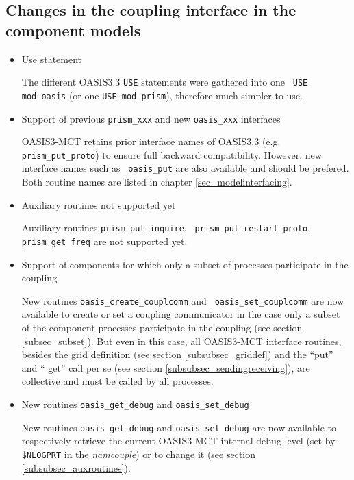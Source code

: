 \subsection{Changes in the coupling interface in the component models}
\label{sec_changes_API}

\begin{itemize}

\item Use statement

The different OASIS3.3 {\tt USE} statements were gathered into one {\tt
  USE mod\_oasis} (or one {\tt USE mod\_prism}), therefore much
  simpler to use.

\item Support of previous {\tt prism\_xxx} and new {\tt oasis\_xxx}
  interfaces

OASIS3-MCT retains prior interface names of OASIS3.3
  (e.g. {\tt prism\_put\_proto}) to ensure full backward
  compatibility. However, new interface names such as {\tt
    oasis\_put} are also available and should be prefered. Both
  routine names are listed in chapter \ref{sec_modelinterfacing}.

\item Auxiliary routines not supported yet

Auxiliary routines {\tt prism\_put\_inquire}, {\tt
  prism\_put\_restart\_proto}, {\tt prism\_get\_freq} are not
  supported yet.

\item Support of components for which only a subset of processes
  participate in the coupling

New routines {\tt oasis\_create\_couplcomm} and {\tt
  oasis\_set\_couplcomm} are now available to create or set a coupling
  communicator in the case only a subset of the component processes
  participate in the coupling (see section \ref{subsec_subset}). But
  even in this case, all OASIS3-MCT interface routines, besides the
  grid definition (see section \ref{subsubsec_griddef}) and the
  ``put'' and `` get'' call per se (see section
  \ref{subsubsec_sendingreceiving}), are collective and must be called
  by all processes.

\item New routines {\tt oasis\_get\_debug} and {\tt oasis\_set\_debug}

New routines {\tt oasis\_get\_debug} and {\tt oasis\_set\_debug}
  are now available to respectively retrieve the current OASIS3-MCT
  internal debug level (set by {\tt \$NLOGPRT} in the {\it namcouple}) or to change it (see section
  \ref{subsubsec_auxroutines}).

\end{itemize}

